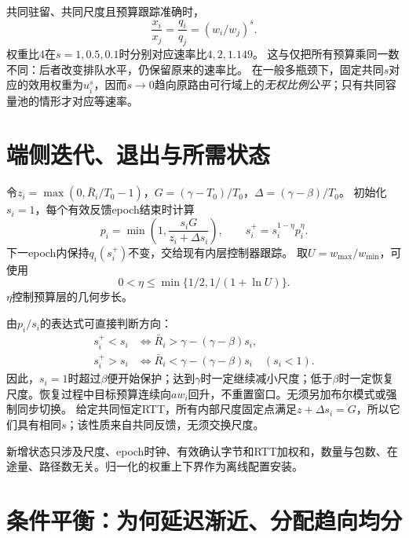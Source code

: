\documentclass[10pt,a4paper]{ctexart}
\begin{document}
共同驻留、共同尺度且预算跟踪准确时，
\[
 \frac{x_i}{x_j}=\frac{q_i}{q_j}=(w_i/w_j)^s.
\]
权重比4在$s=1,0.5,0.1$时分别对应速率比$4,2,1.149$。
这与仅把所有预算乘同一数不同：后者改变排队水平，仍保留原来的速率比。
在一般多瓶颈下，固定共同$s$对应的效用权重为$u_i^s$，因而$s\to0$趋向原路由可行域上的\emph{无权比例公平}；只有共同容量池的情形才对应等速率。

\section{端侧迭代、退出与所需状态}

令$z_i=\max(0,\bar R_i/T_0-1)$，$G=(\gamma-T_0)/T_0$，$\Delta=(\gamma-\beta)/T_0$。
初始化$s_i=1$，每个有效反馈epoch结束时计算
\begin{equation}
 p_i=\min\left(1,\frac{s_iG}{z_i+\Delta s_i}\right),\qquad
 s_i^+=s_i^{1-\eta}p_i^{\eta}.
 \label{eq:zh-scale}
\end{equation}
下一epoch内保持$q_i(s_i^+)$不变，交给现有内层控制器跟踪。
取$U=w_{\max}/w_{\min}$，可使用
\[
 0<\eta\le\min\{1/2,1/(1+\ln U)\}.
\]
$\eta$控制预算层的几何步长。

由$p_i/s_i$的表达式可直接判断方向：
\begin{align*}
 s_i^+<s_i &\iff \bar R_i>\gamma-(\gamma-\beta)s_i,\\
 s_i^+>s_i &\iff \bar R_i<\gamma-(\gamma-\beta)s_i\quad(s_i<1).
\end{align*}
因此，$s_i=1$时超过$\beta$便开始保护；达到$\gamma$时一定继续减小尺度；低于$\beta$时一定恢复尺度。恢复过程中目标预算连续向$aw_i$回升，不重置窗口。无须另加布尔模式或强制同步切换。
给定共同恒定RTT，所有内部尺度固定点满足$z+\Delta s_i=G$，所以它们具有相同$s$；该性质来自共同反馈，无须交换尺度。

新增状态只涉及尺度、epoch时钟、有效确认字节和RTT加权和，数量与包数、在途量、路径数无关。归一化的权重上下界作为离线配置安装。

\section{条件平衡：为何延迟渐近、分配趋向均分}
\end{document}
